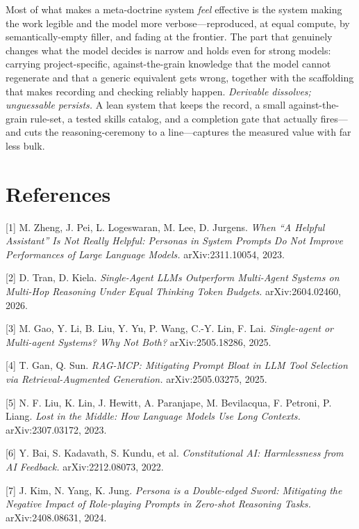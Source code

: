 \documentclass[11pt]{article}
\begin{document}
Most of what makes a meta-doctrine system \emph{feel} effective is the system making the work
legible and the model more verbose---reproduced, at equal compute, by semantically-empty
filler, and fading at the frontier. The part that genuinely changes what the model decides
is narrow and holds even for strong models: carrying project-specific, against-the-grain
knowledge that the model cannot regenerate and that a generic equivalent gets wrong,
together with the scaffolding that makes recording and checking reliably happen.
\emph{Derivable dissolves; unguessable persists.} A lean system that keeps the record, a small
against-the-grain rule-set, a tested skills catalog, and a completion gate that actually
fires---and cuts the reasoning-ceremony to a line---captures the measured value with far
less bulk.

\section*{References}

\begingroup
\setlength{\parindent}{0pt}
\setlength{\parskip}{0.6em}

[1] M. Zheng, J. Pei, L. Logeswaran, M. Lee, D. Jurgens. \emph{When ``A Helpful Assistant'' Is
Not Really Helpful: Personas in System Prompts Do Not Improve Performances of Large
Language Models.} arXiv:2311.10054, 2023.

[2] D. Tran, D. Kiela. \emph{Single-Agent LLMs Outperform Multi-Agent Systems on Multi-Hop
Reasoning Under Equal Thinking Token Budgets.} arXiv:2604.02460, 2026.

[3] M. Gao, Y. Li, B. Liu, Y. Yu, P. Wang, C.-Y. Lin, F. Lai. \emph{Single-agent or
Multi-agent Systems? Why Not Both?} arXiv:2505.18286, 2025.

[4] T. Gan, Q. Sun. \emph{RAG-MCP: Mitigating Prompt Bloat in LLM Tool Selection via
Retrieval-Augmented Generation.} arXiv:2505.03275, 2025.

[5] N. F. Liu, K. Lin, J. Hewitt, A. Paranjape, M. Bevilacqua, F. Petroni, P. Liang.
\emph{Lost in the Middle: How Language Models Use Long Contexts.} arXiv:2307.03172, 2023.

[6] Y. Bai, S. Kadavath, S. Kundu, et al. \emph{Constitutional AI: Harmlessness from AI
Feedback.} arXiv:2212.08073, 2022.

[7] J. Kim, N. Yang, K. Jung. \emph{Persona is a Double-edged Sword: Mitigating the Negative
Impact of Role-playing Prompts in Zero-shot Reasoning Tasks.} arXiv:2408.08631, 2024.
\end{document}
